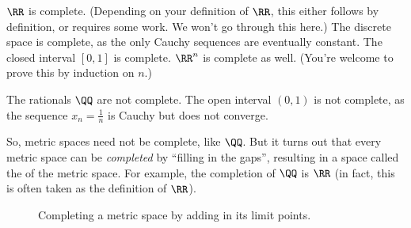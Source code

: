 \begin{example}
	\listhack
	\begin{enumerate}[(a)]
		\ii $\RR$ is complete. (Depending on your definition of $\RR$, this either follows
		by definition, or requires some work. We won't go through this here.)
		\ii The discrete space is complete, as the only Cauchy sequences are eventually constant.
		\ii The closed interval $[0,1]$ is complete.
		\ii $\RR^n$ is complete as well. (You're welcome to prove this by induction on $n$.)
	\end{enumerate}
\end{example}
\begin{example}
	\listhack
	\begin{enumerate}[(a)]
		\ii The rationals $\QQ$ are not complete.
		\ii The open interval $(0,1)$ is not complete, as the sequence $x_n = \frac 1n$
		is Cauchy but does not converge.
	\end{enumerate}
\end{example}

So, metric spaces need not be complete, like $\QQ$.
But it turns out that every metric space can be \emph{completed}
by ``filling in the gaps'', resulting in a space
called the  of the metric space.
For example, the completion of $\QQ$ is $\RR$ (in fact, this is often taken as the definition of $\RR$).

\begin{figure}[ht]
	\centering
	\caption{Completing a metric space by adding in its limit points.}
\end{figure}



